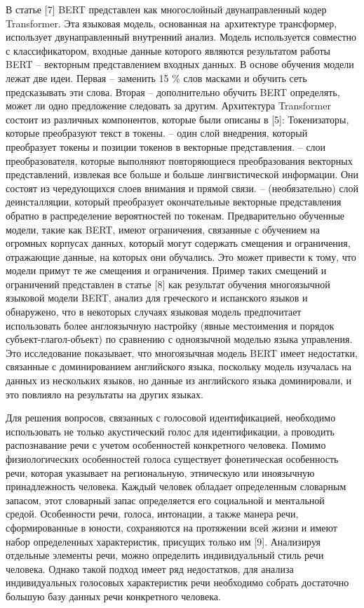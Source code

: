 \begin{multicols}{2}
В статье {[}7{]} BERT представлен как многослойный двунаправленный кодер
Transformer. Эта языковая модель, основанная на~архитектуре трансформер,
использует двунаправленный внутренний анализ. Модель используется
совместно с классификатором, входные данные которого являются
результатом работы BERT -- векторным представлением входных данных. В
основе обучения модели лежат две идеи. Первая -- заменить 15 \% слов
масками и обучить сеть предсказывать эти слова. Вторая -- дополнительно
обучить BERT определять, может ли одно предложение следовать за другим.
Архитектура Transformer состоит из различных компонентов, которые были
описаны в {[}5{]}: Токенизаторы, которые преобразуют текст в токены. --
один слой внедрения, который преобразует токены и позиции токенов в
векторные представления. -- слои преобразователя, которые выполняют
повторяющиеся преобразования векторных представлений, извлекая все
больше и больше лингвистической информации. Они состоят из чередующихся
слоев внимания и прямой связи. -- (необязательно) слой деинсталляции,
который преобразует окончательные векторные представления обратно в
распределение вероятностей по токенам. Предварительно обученные модели,
такие как BERT, имеют ограничения, связанные с обучением на огромных
корпусах данных, который могут содержать смещения и ограничения,
отражающие данные, на которых они обучались. Это может привести к тому,
что модели примут те же смещения и ограничения. Пример таких смещений и
ограничений представлен в статье {[}8{]} как результат обучения
многоязычной языковой модели BERT, анализ для греческого и испанского
языков и обнаружено, что в некоторых случаях языковая модель
предпочитает использовать более англоязычную настройку (явные
местоимения и порядок субъект-глагол-объект) по сравнению с одноязычной
моделью языка управления. Это исследование показывает, что многоязычная
модель BERT имеет недостатки, связанные с доминированием английского
языка, поскольку модель изучалась на данных из нескольких языков, но
данные из английского языка доминировали, и это повлияло на результаты
на других языках.

Для решения вопросов, связанных с голосовой идентификацией, необходимо
использовать не только акустический голос для идентификации, а проводить
распознавание речи с учетом особенностей конкретного человека. Помимо
физиологических особенностей голоса существует фонетическая особенность
речи, которая указывает на региональную, этническую или иноязычную
принадлежность человека. Каждый человек обладает определенным словарным
запасом, этот словарный запас определяется его социальной и ментальной
средой. Особенности речи, голоса, интонации, а также манера речи,
сформированные в юности, сохраняются на протяжении всей жизни и имеют
набор определенных характеристик, присущих только им {[}9{]}. Анализируя
отдельные элементы речи, можно определить индивидуальный стиль речи
человека. Однако такой подход имеет ряд недостатков, для анализа
индивидуальных голосовых характеристик речи необходимо собрать
достаточно большую базу данных речи конкретного человека.


\end{multicols}
